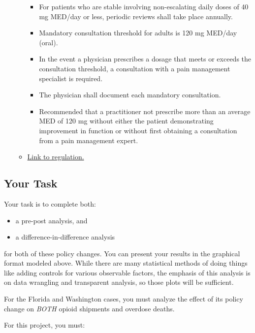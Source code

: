 \documentclass[12pt]{article}
\begin{document}
\begin{itemize}
\begin{itemize}
    \begin{itemize}
      \item For patients who are stable involving non-escalating daily doses of 40 mg MED/day or less, periodic reviews shall take place annually.
      \item Mandatory consultation threshold for adults is 120 mg MED/day (oral).
      \item In the event a physician prescribes a dosage that meets or exceeds the consultation
      threshold, a consultation with a pain management specialist is required.
      \item The physician shall document each mandatory consultation.
      \item Recommended that a practitioner not prescribe more than an average MED of
      120 mg without either the patient demonstrating improvement in function or without first obtaining a consultation from a pain management expert.
    \end{itemize}
    \item \href{http://apps.leg.wa.gov/documents/laws/wsr/2011/12/11-12-025.htm}{Link to regulation.}
    \end{itemize}
\end{itemize}


\subsection*{Your Task}

Your task is to complete both:

\begin{itemize}
  \item a pre-post analysis, and
  \item a difference-in-difference analysis
\end{itemize}

for both of these policy changes. You can present your results in the graphical format modeled above. While there are many statistical methods of doing things like adding controls for various observable factors, the emphasis of this analysis is on data wrangling and transparent analysis, so those plots will be sufficient.

For the Florida and Washington cases, you must analyze the effect of its policy change on \emph{BOTH} opioid shipments and overdose deaths.

For this project, you must:
\end{document}
